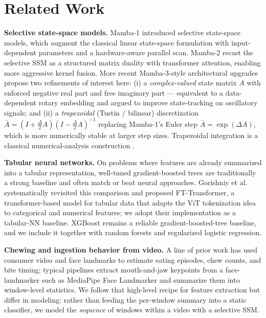 \documentclass{article}
\begin{document}
\section{Related Work}

\textbf{Selective state-space models.} Mamba-1 \cite{gu2023mamba} introduced selective state-space models, which augment the classical linear state-space formulation with input-dependent parameters and a hardware-aware parallel scan. Mamba-2 \cite{dao2024mamba2} recast the selective SSM as a structured matrix duality with transformer attention, enabling more aggressive kernel fusion. More recent Mamba-3-style architectural upgrades propose two refinements of interest here: (i) a \emph{complex-valued} state matrix $A$ with enforced negative real part and free imaginary part --- equivalent to a data-dependent rotary embedding and argued to improve state-tracking on oscillatory signals; and (ii) a \emph{trapezoidal} (Tustin / bilinear) discretization $\bar{A} = (I + \tfrac{\Delta}{2}A)(I - \tfrac{\Delta}{2}A)^{-1}$ replacing Mamba-1's Euler step $\bar{A} = \exp(\Delta A)$, which is more numerically stable at larger step sizes. Trapezoidal integration is a classical numerical-analysis construction \cite{hairer1996}.

\textbf{Tabular neural networks.} On problems where features are already summarized into a tabular representation, well-tuned gradient-boosted trees are traditionally a strong baseline and often match or beat neural approaches. Gorishniy et al.\ \cite{gorishniy2021rtdl} systematically revisited this comparison and proposed FT-Transformer, a transformer-based model for tabular data that adapts the ViT tokenization idea to categorical and numerical features; we adopt their implementation as a tabular-NN baseline. XGBoost \cite{chen2016xgboost} remains a reliable gradient-boosted-tree baseline, and we include it together with random forests and regularized logistic regression.

\textbf{Chewing and ingestion behavior from video.} A line of prior work has used consumer video and face landmarks to estimate eating episodes, chew counts, and bite timing; typical pipelines extract mouth-and-jaw keypoints from a face-landmarker such as MediaPipe Face Landmarker \cite{mediapipe2022} and summarize them into window-level statistics. We follow that high-level recipe for feature extraction but differ in modeling: rather than feeding the per-window summary into a static classifier, we model the \emph{sequence} of windows within a video with a selective SSM.
\end{document}
